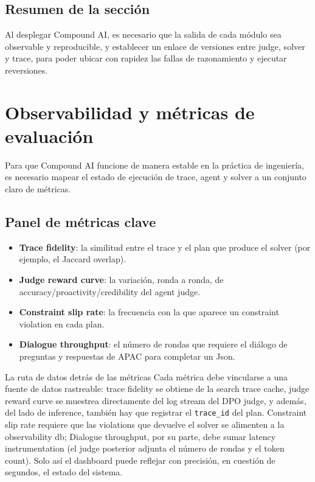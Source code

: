\documentclass[a4paper]{article}
\begin{document}
\subsection{Resumen de la sección}

Al desplegar Compound AI, es necesario que la salida de cada módulo sea observable y reproducible, y establecer un enlace de versiones entre judge, solver y trace, para poder ubicar con rapidez las fallas de razonamiento y ejecutar reversiones.

\section{Observabilidad y métricas de evaluación}

Para que Compound AI funcione de manera estable en la práctica de ingeniería, es necesario mapear el estado de ejecución de trace, agent y solver a un conjunto claro de métricas.

\subsection{Panel de métricas clave}

\begin{itemize}
    \item \textbf{Trace fidelity}: la similitud entre el trace y el plan que produce el solver (por ejemplo, el Jaccard overlap).
    \item \textbf{Judge reward curve}: la variación, ronda a ronda, de accuracy/proactivity/credibility del agent judge.
    \item \textbf{Constraint slip rate}: la frecuencia con la que aparece un constraint violation en cada plan.
    \item \textbf{Dialogue throughput}: el número de rondas que requiere el diálogo de preguntas y respuestas de APAC para completar un Json.
\end{itemize}

\begin{importantbox}{La ruta de datos detrás de las métricas}
Cada métrica debe vincularse a una fuente de datos rastreable: trace fidelity se obtiene de la search trace cache, judge reward curve se muestrea directamente del log stream del DPO judge, y además, del lado de inference, también hay que registrar el \texttt{trace\_id} del plan. Constraint slip rate requiere que las violations que devuelve el solver se alimenten a la observability db; Dialogue throughput, por su parte, debe sumar latency instrumentation (el judge posterior adjunta el número de rondas y el token count). Solo así el dashboard puede reflejar con precisión, en cuestión de segundos, el estado del sistema.
\end{importantbox}
\end{document}
